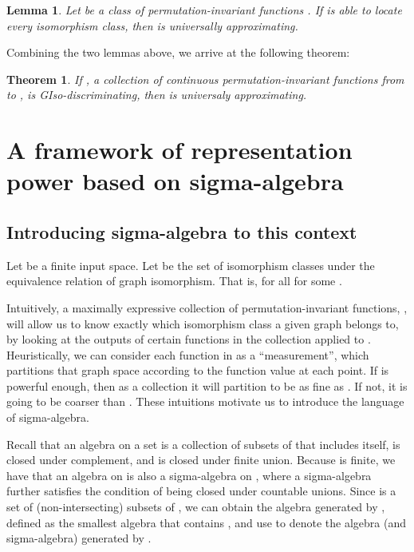 \documentclass{article}
\newtheorem{theorem}{Theorem}
\newtheorem{lemma}{Lemma}
\begin{document}
\begin{lemma} \label{lemma.locate.approx}
Let  be a class of permutation-invariant functions . 
If  is able to locate every isomorphism class, then  is universally approximating.
\end{lemma}


Combining the two lemmas above, we arrive at the following theorem:

\begin{theorem}
If , a collection of continuous permutation-invariant functions from  to , is GIso-discriminating, then  is universaly approximating.
\end{theorem}




\section{A framework of representation power based on sigma-algebra}
\label{sec.sigma}
\subsection{Introducing sigma-algebra to this context}
Let  be a finite input space. Let  be the set of isomorphism classes under the equivalence relation of graph isomorphism. That is, for all  for some .

Intuitively, a maximally expressive collection of permutation-invariant functions, , will allow us to know exactly which isomorphism class  a given graph  belongs to, by looking at the outputs of certain functions in the collection applied to . Heuristically, we can consider each function in  as a ``measurement'', which partitions that graph space  according to the function value at each point. If  is powerful enough, then as a collection it will partition  to be as fine as . If not, it is going to be coarser than . These intuitions motivate us to introduce the language of sigma-algebra.

Recall that an algebra on a set  is a collection of subsets of  that includes  itself, is closed under complement, and is closed under finite union. Because  is finite, we have that an algebra on  is also a sigma-algebra on , where a sigma-algebra further satisfies the condition of being closed under countable unions. Since  is a set of (non-intersecting) subsets of , we can obtain the algebra generated by , defined as the smallest algebra that contains , and use  to denote the algebra (and sigma-algebra) generated by .
\end{document}
